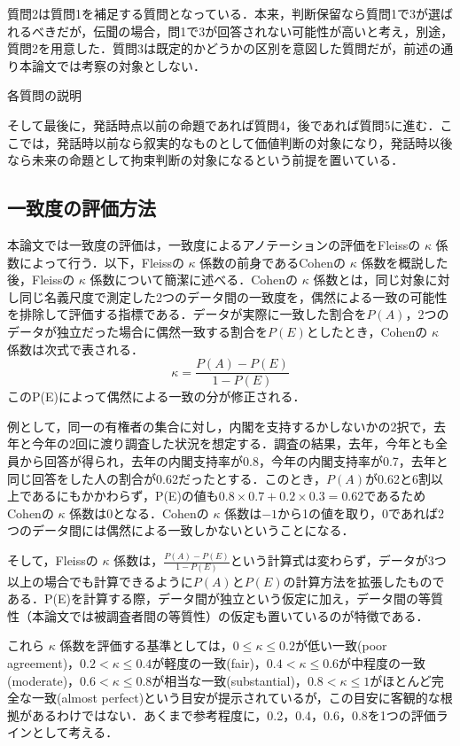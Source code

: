 \documentclass[japanese]{jnlp_1.4}
\begin{document}
質問2は質問1を補足する質問となっている．本来，判断保留なら質問1で3が選ばれるべきだが，伝聞の場合，問1で3が回答されない可能性が高いと考え，別途，質問2を用意した．質問3は既定的かどうかの区別を意図した質問だが，前述の通り本論文では考察の対象としない．

\begin{table}[t]
\caption{各質問の説明}

\end{table}

そして最後に，発話時点以前の命題であれば質問4，後であれば質問5に進む．ここでは，発話時以前なら叙実的なものとして価値判断の対象になり，発話時以後なら未来の命題として拘束判断の対象になるという前提を置いている．



\subsection{一致度の評価方法}

本論文では一致度の評価は，一致度によるアノテーションの評価をFleissの $\kappa$ 係数\cite{Article_08}によって行う．以下，Fleissの $\kappa$ 係数の前身であるCohenの $\kappa$ 係数\cite{Article_07}を概説した後，Fleissの $\kappa$ 係数について簡潔に述べる．Cohenの $\kappa$ 係数とは，同じ対象に対し同じ名義尺度で測定した2つのデータ間の一致度を，偶然による一致の可能性を排除して評価する指標である\cite{Article_07}．データが実際に一致した割合を$P(A)$，2つのデータが独立だった場合に偶然一致する割合を$P(E)$としたとき，Cohenの $\kappa$ 係数は次式で表される．
\[
\kappa = \frac{P(A)-P(E)}{1-P(E)}
\]
このP(E)によって偶然による一致の分が修正される．

例として，同一の有権者の集合に対し，内閣を支持するかしないかの2択で，去年と今年の2回に渡り調査した状況を想定する．調査の結果，去年，今年とも全員から回答が得られ，去年の内閣支持率が0.8，今年の内閣支持率が0.7，去年と同じ回答をした人の割合が0.62だったとする．このとき，$P(A)$が0.62と6割以上であるにもかかわらず，P(E)の値も$0.8 \times 0.7 + 0.2 \times 0.3 = 0.62$であるためCohenの $\kappa$ 係数は0となる．Cohenの $\kappa$ 係数は$-1$から1の値を取り，0であれば2つのデータ間には偶然による一致しかないということになる．

そして，Fleissの $\kappa$ 係数は，$\frac{P(A)-P(E)}{1-P(E)}$という計算式は変わらず，データが3つ以上の場合でも計算できるように$P(A)$と$P(E)$の計算方法を拡張したものである．P(E)を計算する際，データ間が独立という仮定に加え，データ間の等質性（本論文では被調査者間の等質性）の仮定も置いているのが特徴である．

これら $\kappa$ 係数を評価する基準としては，$0\le\kappa\le0.2$が低い一致(poor agreement)，$0.2<\kappa\le0.4$が軽度の一致(fair)，$0.4<\kappa\le0.6$が中程度の一致(moderate)，$0.6<\kappa\le0.8$が相当な一致(substantial)，$0.8<\kappa\le1$がほとんど完全な一致(almost perfect)という目安が提示されているが\cite{Article_09,Book_24}，この目安に客観的な根拠があるわけではない．あくまで参考程度に，0.2，0.4，0.6，0.8を1つの評価ラインとして考える．
\end{document}
